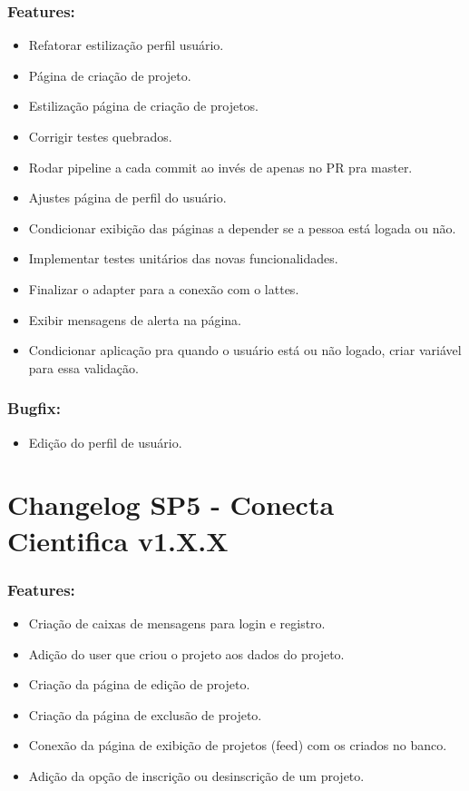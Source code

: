 \documentclass[
40pt,				%
openright,			%
oneside,			%
a4paper,			%
chapter=TITLE,		%
sumario=tradicional,
english,			%
]{abntex2}
\begin{document}
	\subsection*{\textbf{Features:}}
	\begin{itemize} \setlength\itemsep{0em}
		
		\item Refatorar estilização perfil usuário.
		\item Página de criação de projeto.
		\item Estilização página de criação de projetos.
		\item Corrigir testes quebrados.
		\item Rodar pipeline a cada commit ao invés de apenas no PR pra master.
		\item Ajustes página de perfil do usuário.
		\item Condicionar exibição das páginas a depender se a pessoa está logada ou não.
		\item Implementar testes unitários das novas funcionalidades.
		\item Finalizar o adapter para a conexão com o lattes.
		\item Exibir mensagens de alerta na página.
		\item Condicionar aplicação pra quando o usuário está ou não logado, criar variável para essa validação.

	\end{itemize}

	\subsection*{\textbf{Bugfix:}}
	\begin{itemize} \setlength\itemsep{0em}

		\item Edição do perfil de usuário.

	\end{itemize}

	\chapter*{Changelog SP5 - Conecta Cientifica v1.X.X} 
	
	\subsection*{\textbf{Features:}}
	\begin{itemize} \setlength\itemsep{0em}
		
		\item Criação de caixas de mensagens para login e registro.
		\item Adição do user que criou o projeto aos dados do projeto.
		\item Criação da página de edição de projeto.
		\item Criação da página de exclusão de projeto.
		\item Conexão da página de exibição de projetos (feed) com os criados no banco.
		\item Adição da opção de inscrição ou desinscrição de um projeto.

	\end{itemize}
\end{document}
